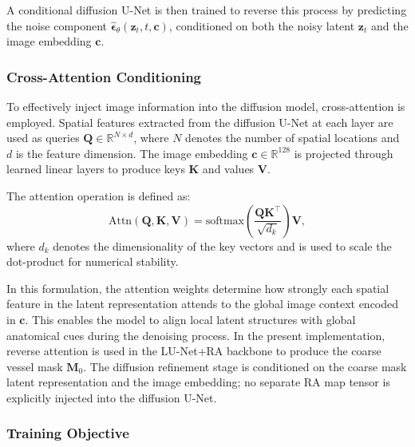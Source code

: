 \documentclass[journal,article,submit,pdftex,moreauthors]{Definitions/mdpi}
\begin{document}
A conditional diffusion U-Net is then trained to reverse this process by predicting the noise component $\hat{\boldsymbol{\epsilon}}_\theta(\mathbf{z}_t,t,\mathbf{c})$, conditioned on both the noisy latent $\mathbf{z}_t$ and the image embedding $\mathbf{c}$.


\subsubsection{Cross-Attention Conditioning}

To effectively inject image information into the diffusion model, cross-attention is employed. Spatial features extracted from the diffusion U-Net at each layer are used as queries $\mathbf{Q}\in\mathbb{R}^{N\times d}$, where $N$ denotes the number of spatial locations and $d$ is the feature dimension. The image embedding $\mathbf{c}\in\mathbb{R}^{128}$ is projected through learned linear layers to produce keys $\mathbf{K}$ and values $\mathbf{V}$.

The attention operation is defined as:
\begin{equation}
\mathrm{Attn}(\mathbf{Q},\mathbf{K},\mathbf{V})=
\mathrm{softmax}\!\left(\frac{\mathbf{Q}\mathbf{K}^\top}{\sqrt{d_k}}\right)\mathbf{V},
\end{equation}
where $d_k$ denotes the dimensionality of the key vectors and is used to scale the dot-product for numerical stability.

In this formulation, the attention weights determine how strongly each spatial feature in the latent representation attends to the global image context encoded in $\mathbf{c}$. This enables the model to align local latent structures with global anatomical cues during the denoising process. In the present implementation, reverse attention is used in the LU-Net+RA backbone to produce the coarse vessel mask $\mathbf{M}_0$. The diffusion refinement stage is conditioned on the coarse mask latent representation and the image embedding; no separate RA map tensor is explicitly injected into the diffusion U-Net.

\subsubsection{Training Objective}
\end{document}
